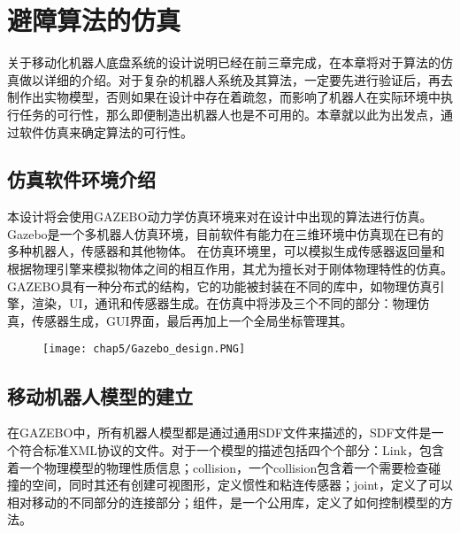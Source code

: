 

\chapter{避障算法的仿真}
\label{chap:simulation}
关于移动化机器人底盘系统的设计说明已经在前三章完成，在本章将对于算法的仿真做以详细的介绍。对于复杂的机器人系统及其算法，一定要先进行验证后，再去制作出实物模型，否则如果在设计中存在着疏忽，而影响了机器人在实际环境中执行任务的可行性，那么即便制造出机器人也是不可用的。本章就以此为出发点，通过软件仿真来确定算法的可行性。

\section{仿真软件环境介绍}
本设计将会使用GAZEBO动力学仿真环境来对在设计中出现的算法进行仿真。Gazebo是一个多机器人仿真环境，目前软件有能力在三维环境中仿真现在已有的多种机器人，传感器和其他物体。 在仿真环境里，可以模拟生成传感器返回量和根据物理引擎来模拟物体之间的相互作用，其尤为擅长对于刚体物理特性的仿真。GAZEBO具有一种分布式的结构，它的功能被封装在不同的库中，如物理仿真引擎，渲染，UI，通讯和传感器生成。在仿真中将涉及三个不同的部分：物理仿真，传感器生成，GUI界面，最后再加上一个全局坐标管理其。
\begin{figure}[!htp]
  \centering
  \texttt{[image: chap5/Gazebo\_design.PNG]}
\end{figure}
\section{移动机器人模型的建立}
在GAZEBO中，所有机器人模型都是通过通用SDF文件来描述的，SDF文件是一个符合标准XML协议的文件。对于一个模型的描述包括四个个部分：Link，包含着一个物理模型的物理性质信息；collision，一个collision包含着一个需要检查碰撞的空间，同时其还有创建可视图形，定义惯性和粘连传感器；joint，定义了可以相对移动的不同部分的连接部分；组件，是一个公用库，定义了如何控制模型的方法。

